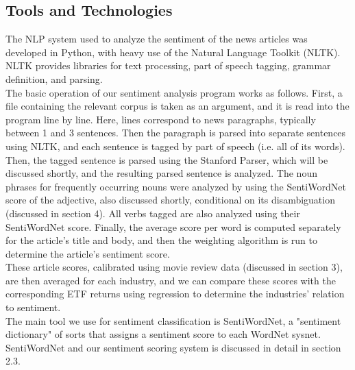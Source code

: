 \documentclass[pageno]{jpaper}
\begin{document}
\subsection{Tools and Technologies}
\indent The NLP system used to analyze the sentiment of the news articles was developed in Python, with heavy use of the Natural Language Toolkit (NLTK). NLTK provides libraries for text processing, part of speech tagging, grammar definition, and parsing. \\
\indent The basic operation of our sentiment analysis program works as follows. First, a file containing the relevant corpus is taken as an argument, and it is read into the program line by line. Here, lines correspond to news paragraphs, typically between 1 and 3 sentences. Then the paragraph is parsed into separate sentences using NLTK, and each sentence is tagged by part of speech (i.e. all of its words). Then, the tagged sentence is parsed using the Stanford Parser, which will be discussed shortly, and the resulting parsed sentence is analyzed. The noun phrases for frequently occurring nouns were analyzed by using the SentiWordNet score of the adjective, also discussed shortly, conditional on its disambiguation (discussed in section 4). All verbs tagged are also analyzed using their SentiWordNet score. Finally, the average score per word is computed separately for the article's title and body, and then the weighting algorithm is run to determine the article's sentiment score. \\
\indent These article scores, calibrated using movie review data (discussed in section 3), are then averaged for each industry, and we can compare these scores with the corresponding ETF returns using regression to determine the industries' relation to sentiment. \\
\indent The main tool we use for sentiment classification is SentiWordNet, a "sentiment dictionary" of sorts that assigns a sentiment score to each WordNet sysnet. SentiWordNet and our sentiment scoring system is discussed in detail in section 2.3.
\end{document}
